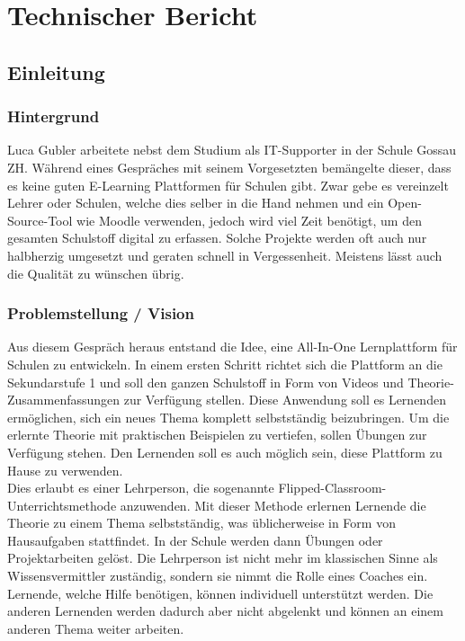 \section{Technischer Bericht}
\subsection{Einleitung}

\subsubsection{Hintergrund}
Luca Gubler arbeitete nebst dem Studium als IT-Supporter in der Schule Gossau ZH. Während eines Gespräches mit seinem Vorgesetzten bemängelte dieser, dass es keine guten E-Learning Plattformen für Schulen gibt. Zwar gebe es vereinzelt Lehrer oder Schulen, welche dies selber in die Hand nehmen und ein Open-Source-Tool wie Moodle verwenden, jedoch wird viel Zeit benötigt, um den gesamten Schulstoff digital zu erfassen. Solche Projekte werden oft auch nur halbherzig umgesetzt und geraten schnell in Vergessenheit. Meistens lässt auch die Qualität zu wünschen übrig.

\subsubsection{Problemstellung / Vision}
Aus diesem Gespräch heraus entstand die Idee, eine All-In-One Lernplattform für Schulen zu entwickeln. In einem ersten Schritt richtet sich die Plattform an die Sekundarstufe 1 und soll den ganzen Schulstoff in Form von Videos und Theorie-Zusammenfassungen zur Verfügung stellen. Diese Anwendung soll es Lernenden ermöglichen, sich ein neues Thema komplett selbstständig beizubringen. Um die erlernte Theorie mit praktischen Beispielen zu vertiefen, sollen Übungen zur Verfügung stehen. Den Lernenden soll es auch möglich sein, diese Plattform zu Hause zu verwenden. \\

Dies erlaubt es einer Lehrperson, die sogenannte Flipped-Classroom-Unterrichtsmethode anzuwenden. Mit dieser Methode erlernen Lernende die Theorie zu einem Thema selbstständig, was üblicherweise in Form von Hausaufgaben stattfindet. In der Schule werden dann Übungen oder Projektarbeiten gelöst. Die Lehrperson ist nicht mehr im klassischen Sinne als Wissensvermittler zuständig, sondern sie nimmt die Rolle eines Coaches ein. Lernende, welche Hilfe benötigen, können individuell unterstützt werden. Die anderen Lernenden werden dadurch aber nicht abgelenkt und können an einem anderen Thema weiter arbeiten. \\

